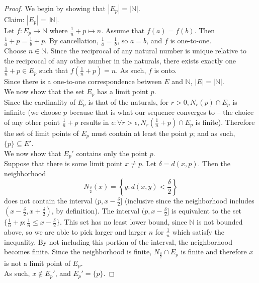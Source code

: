 \documentclass[10pt]{article}
\theoremstyle{definition}
\theoremstyle{plain}
\newcommand{\N}{\mathbb{N}}
\begin{document}
\begin{proof}
We begin by showing that $|E_p| = |\N|.$ \\

Claim: $|E_p|=|\N|$. \\

Let $f:E_p \rightarrow\N$ where $\frac{1}{n} + p \mapsto n$. Assume that $f(a)=f(b)$. Then $\frac{1}{a} + p =\frac{1}{b} + p$. By cancellation, $\frac{1}{a}=\frac{1}{b}$, so $a=b$, and $f$ is one-to-one. \\

Choose $n\in\N$. Since the reciprocal of any natural number is unique relative to the reciprocal of any other number in the naturals, there exists exactly one $\frac{1}{n} + p \in E_p$ such that $f(\frac{1}{n} + p) = n$. As such, $f$ is onto. \\

Since there is a one-to-one correspondence between $E$ and $\N$, $|E|=|\N|$. \\

We now show that the set $E_p$ has a limit point $p$. \\

Since the cardinality of $E_p$ is that of the naturals, for $r>0, N_r(p)\cap E_p$ is infinite (we choose $p$ because that is what our sequence converges to -- the choice of any other point $\frac{1}{n} + p$ results in $\epsilon: \forall r > \epsilon,
N_r(\frac{1}{n} + p)\cap E_p$ is finite). Therefore the set of limit points of $E_p$ must contain at least the point $p$; and as such, $\{p\}\subseteq E'$. \\

We now show that $E_p'$ contains only the point $p$. \\

Suppose that there is some limit point $x\neq p$. Let $\delta = d(x,p)$. Then the neighborhood
$$N_\frac{\delta}{2} (x) = \left\{y: d(x,y) < \frac{\delta}{2}\right\}$$
does not contain the interval $(p, x -\frac{\delta}{2}]$ (inclusive since the neighborhood includes $(x -\frac{\delta}{2}, x +\frac{\delta}{2})$, by definition). The interval $(p, x -\frac{\delta}{2}]$ is equivalent to the set $\{\frac{1}{n} + p: \frac{1}{n} \leq x -\frac{\delta}{2}\}$. This set has no least lower bound, since $\N$ is not bounded above, so we are able to pick larger and larger $n$ for $\frac{1}{n}$ which satisfy the inequality. By not including this portion of the interval, the neighborhood becomes finite. Since the neighborhood is finite, $N_\frac{\delta}{2} \cap E_p$ is finite and therefore $x$ is not a limit point of $E_p$. \\

As such, $x\not\in E_p'$, and $E_p' = \{p\}$.
\end{proof}
\end{document}
